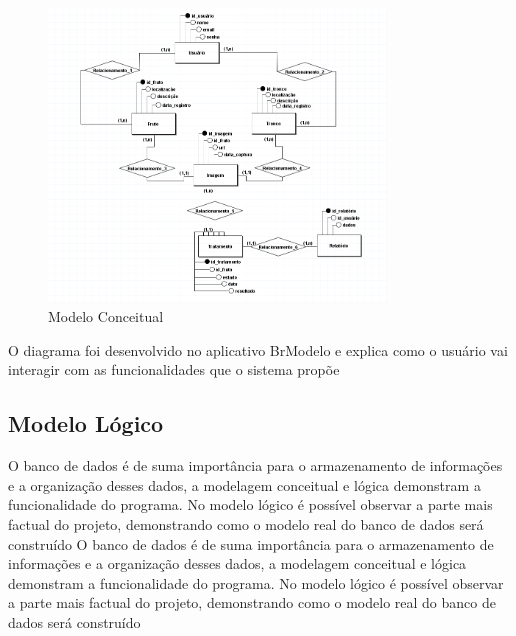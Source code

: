 \documentclass[
  a4paper,%
  12pt,%
  english,%
  brazilian,%
]{article}
\begin{document}
    \begin{figure}[h]
\centering
\caption{Modelo Conceitual}%
\label{fig:diagrama-conceitual}
 \includegraphics[width=0.8\textwidth]{Logos/diagrama de classe.png}
\end{figure}

     O diagrama foi desenvolvido no aplicativo BrModelo e explica como o usuário vai interagir com as funcionalidades que o sistema propõe

    \subsection*{Modelo Lógico}

    O banco de dados é de suma importância para o armazenamento de informações e a organização desses dados, a modelagem conceitual e lógica demonstram a funcionalidade do programa. No modelo lógico é possível observar a parte mais factual do projeto, demonstrando como o modelo real do banco de dados será construído O banco de dados é de suma importância para o armazenamento de informações e a organização desses dados, a modelagem conceitual e lógica demonstram a funcionalidade do programa. No modelo lógico é possível observar a parte mais factual do projeto, demonstrando como o modelo real do banco de dados será construído  
\end{document}
